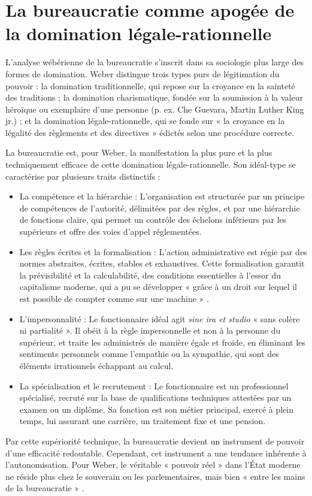 \section{La bureaucratie comme apogée de la domination légale-rationnelle}
L'analyse wébérienne de la bureaucratie s'inscrit dans sa sociologie plus large des formes de domination. Weber distingue trois types purs de légitimation du pouvoir : la domination traditionnelle, qui repose sur la croyance en la sainteté des traditions ; la domination charismatique, fondée sur la soumission à la valeur héroïque ou exemplaire d'une personne (p. ex. Che Guevara, Martin Luther King jr.) ; et la domination légale-rationnelle, qui se fonde sur « la croyance en la légalité des règlements et des directives »  édictés selon une procédure correcte.

La bureaucratie est, pour Weber, la manifestation la plus pure et la plus techniquement efficace de cette domination légale-rationnelle. Son idéal-type se caractérise par plusieurs traits distinctifs :
\vspace{2em}

\begin{itemize}[label=\textbullet]
    \item La compétence et la hiérarchie : L'organisation est structurée par un principe de compétences de l'autorité, délimitées par des règles, et par une hiérarchie de fonctions claire, qui permet un contrôle des échelons inférieurs par les supérieurs et offre des voies d'appel réglementées.
    \item Les règles écrites et la formalisation : L'action administrative est régie par des normes abstraites, écrites, stables et exhaustives. Cette formalisation garantit la prévisibilité et la calculabilité, des conditions essentielles à l'essor du capitalisme moderne, qui a pu se développer « grâce à un droit sur lequel il est possible de compter comme sur une machine » .
    \item L'impersonnalité : Le fonctionnaire idéal agit \textit{sine ira et studio} « sans colère ni partialité ». Il obéit à la règle impersonnelle et non à la personne du supérieur, et traite les administrés de manière égale et froide, en éliminant les sentiments personnels comme l'empathie ou la sympathie, qui sont des éléments irrationnels échappant au calcul.
    \item La spécialisation et le recrutement : Le fonctionnaire est un professionnel spécialisé, recruté sur la base de qualifications techniques attestées par un examen ou un diplôme. Sa fonction est son métier principal, exercé à plein temps, lui assurant une carrière, un traitement fixe et une pension.
\end{itemize}
Par cette supériorité technique, la bureaucratie devient un instrument de pouvoir d'une efficacité redoutable. Cependant, cet instrument a une tendance inhérente à l'autonomisation. Pour Weber, le véritable « pouvoir réel »  dans l'État moderne ne réside plus chez le souverain ou les parlementaires, mais bien « entre les mains de la bureaucratie » .


